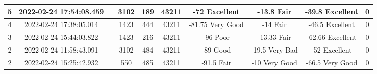 \begin{longtable*}{|c|c|c|c|c|c|c|c|c|c|}
5&2022-02-24 17:54:08.459&&3102&189&43211& -72       Excellent   & -13.8     Fair        & -39.8     Excellent   & 0\\\hline
{}4&2022-02-24 17:38:05.014&&1423&444&43211& -81.75    Very Good   & -14       Fair        & -46.5     Excellent   & 0\\\hline
{}3&2022-02-24 15:44:03.822&&1423&216&43211& -96       Poor        & -13.33    Fair        & -62.66    Excellent   & 0\\\hline
{}2&2022-02-24 11:58:43.091&&3102&484&43211& -89       Good        & -19.5     Very Bad    & -52       Excellent   & 0\\\hline
{}2&2022-02-24 15:25:42.932&&550&485&43211& -91.5     Fair        & -10       Very Good   & -66.5     Very Good   & 0\\\hline
\end{longtable*}

